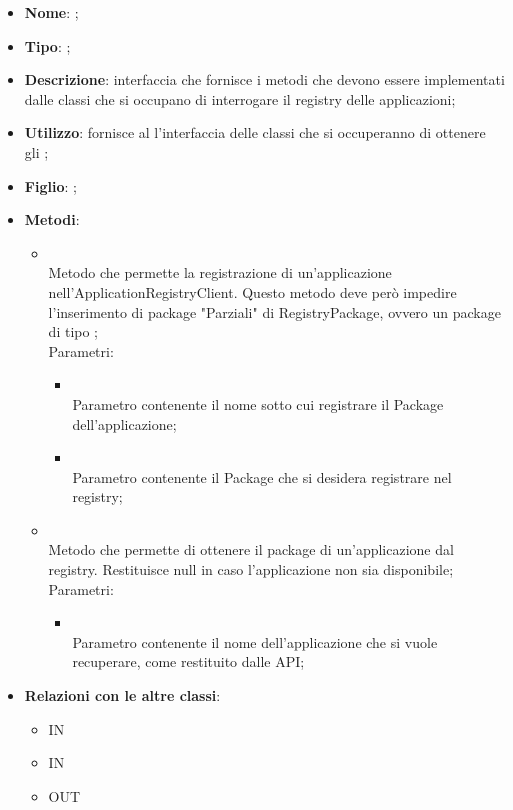 \begin{itemize}
	\item \textbf{Nome}: ;
	\item \textbf{Tipo}: ;
	\item \textbf{Descrizione}: interfaccia che fornisce i metodi che devono essere implementati dalle classi che si occupano di interrogare il registry delle applicazioni;
	\item \textbf{Utilizzo}: fornisce al  l'interfaccia delle classi che si occuperanno di ottenere gli ;
	\item \textbf{Figlio}: ;
	\item \textbf{Metodi}:
	\begin{itemize}
		\item[]  \\
		Metodo che permette la registrazione di un'applicazione nell'ApplicationRegistryClient. Questo metodo deve però impedire l'inserimento di package "Parziali" di RegistryPackage, ovvero un package di tipo ;\\
		Parametri:
		\begin{itemize}
			\item {} \\
			Parametro contenente il nome sotto cui registrare il Package dell'applicazione;
			\item {} \\
			Parametro contenente il Package che si desidera registrare nel registry;
		\end{itemize}
		\item[]  \\
		Metodo che permette di ottenere il package di un'applicazione dal registry. Restituisce null in caso l'applicazione non sia disponibile;\\
		Parametri:
		\begin{itemize}
			\item {} \\
			Parametro contenente il nome dell'applicazione che si vuole recuperare, come restituito dalle API;
		\end{itemize}
	\end{itemize}
	\item \textbf{Relazioni con le altre classi}:
	\begin{itemize}
		\item IN \hyperlink{Manager_label}{}
		\item IN \hyperlink{ApplicationRegistryLocalClient_label}{}
		\item OUT \hyperlink{ApplicationPackage_label}{}
	\end{itemize}
\end{itemize}
\FloatBarrier


